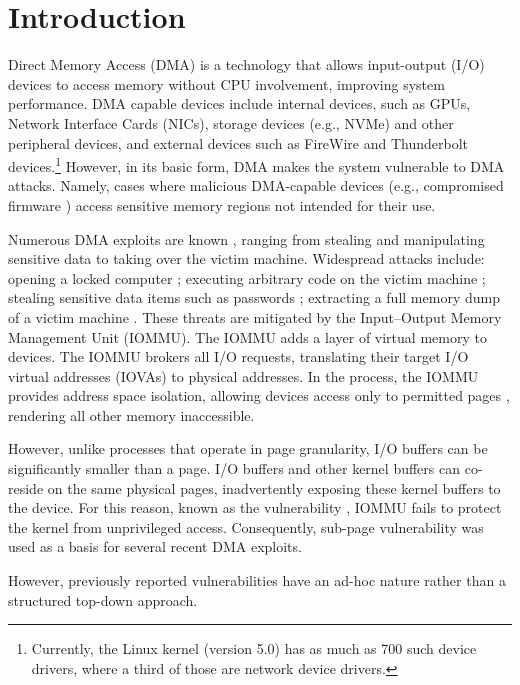 \section{Introduction}

Direct Memory Access (DMA) is a technology that allows input-output (I/O) devices to access memory without CPU involvement, improving system performance.
DMA capable devices include internal devices, such as GPUs, Network Interface Cards (NICs), storage devices (e.g., NVMe) and other peripheral devices, and external devices such as FireWire and Thunderbolt devices.\footnote{Currently, the Linux kernel (version 5.0) has as much as 700 such device drivers, where a third of those are network device drivers.} However, in its basic form, DMA makes the system vulnerable to DMA attacks. Namely, cases where malicious DMA-capable devices (e.g., compromised firmware \cite{Gal14,Ben17a}) access sensitive memory regions not intended for their use. 


Numerous DMA exploits are known \cite{Dor04,BDK10,thunder}, ranging from stealing and manipulating sensitive data to taking over the victim machine. Widespread attacks include: opening a locked computer \cite{MM, Fin14}; executing arbitrary code on the victim machine \cite{Fri16, Woj08, AD10,thunder}; stealing sensitive data items such as passwords \cite{SB12, LKV13, Cim16, BR12}; extracting a full memory dump of a victim machine \cite{MM, Vol, Fin14, GA10}. These threats are mitigated by the Input–Output Memory Management Unit (IOMMU). The IOMMU adds a layer of virtual memory to devices. The IOMMU brokers all I/O requests, translating their target I/O virtual addresses (IOVAs) to physical addresses. In the process, the IOMMU provides address space isolation, allowing devices access only to permitted pages
, rendering all other memory inaccessible.

However, unlike processes that operate in page granularity, I/O buffers can be significantly smaller than a page. I/O buffers and other kernel buffers can co-reside on the same physical pages, inadvertently exposing these kernel buffers to the device. For this reason, known as the \subpage{} vulnerability \cite{MMT16,thunder}, IOMMU fails to protect the kernel from unprivileged access. Consequently, sub-page vulnerability was used as a basis for several recent DMA exploits.


However, previously reported vulnerabilities have an ad-hoc nature \cite{thunder,MMT16,Ben17b} rather than a structured top-down approach. 

